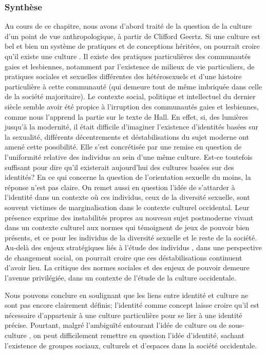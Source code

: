 \subsubsection{Synthèse}
\label{sec:synth_se}
Au cours de ce chapitre, nous avons d'abord traité de la question de la culture d'un point de vue anthropologique, à partir de Clifford Geertz.
Si une culture est bel et bien un système de pratiques et de conceptions héritées, on pourrait croire qu'il existe une culture \lgbt{}.
Il existe des pratiques particulières des communautés gaies et lesbiennes, notamment par l'existence de milieux de vie particuliers, de pratiques sociales et sexuelles différentes des hétérosexuels et d'une histoire particulière à cette communauté (qui demeure tout de même imbriquée dans celle de la société majoritaire).
Le contexte social, politique et intellectuel du dernier siècle semble avoir été propice à l'irruption des communautés gaies et lesbiennes, comme nous l'apprend la partie sur le texte de Hall.
En effet, si, des lumières jusqu'à la modernité, il était difficile d'imaginer l'existence d'identités basées sur la sexualité, différents décentrements et déstabilisations du sujet moderne ont amené cette possibilité.
Elle s'est concrétisée par une remise en question de l'uniformité relative des individus au sein d'une même culture.
Est-ce toutefois suffisant pour dire qu'il existerait aujourd'hui des cultures basées sur des identités?
En ce qui concerne la question de l'orientation sexuelle du moins, la réponse n'est pas claire.
On remet aussi en question l'idée de s'attarder à l'identité dans un contexte où ces individus, ceux de la diversité sexuelle, sont souvent victimes de marginalisation dans le contexte culturel occidental.
Leur présence exprime des instabilités propres au nouveau sujet postmoderne vivant dans un contexte culturel aux normes qui témoignent de jeux de pouvoir bien présents, et ce pour les individus de la diversité sexuelle et le reste de la société.
Au-delà des enjeux stratégiques liés à l'étude des individus \lgbt{}, dans une perspective de changement social, on pourrait croire que ces déstabilisations continuent d'avoir lieu.
La critique des normes sociales et des enjeux de pouvoir demeure l'avenue privilégiée, dans un contexte de l'étude de la culture occidentale.

Nous pouvons conclure en soulignant que les liens entre identité et culture ne sont pas encore clairement définis; l'identité comme concept laisse croire qu'il est nécessaire d'appartenir à une culture particulière pour se lier à une identité précise.
Pourtant, malgré l'ambiguïté entourant l'idée de culture ou de sous-culture \lgbt{}, on peut difficilement remettre en question l'idée d'identité, sachant l'existence de groupes sociaux, culturels et d'espaces \lgbt{} dans la société occidentale.

